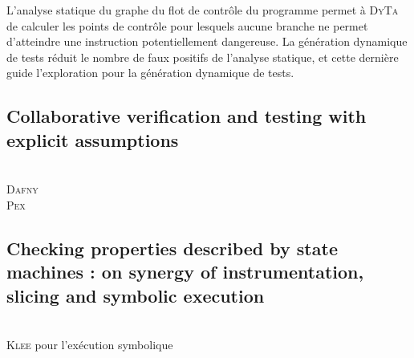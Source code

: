 L'analyse statique du graphe du flot de contrôle du programme permet à
\textsc{DyTa} de calculer les points de contrôle pour lesquels aucune branche ne
permet d'atteindre une instruction potentiellement dangereuse. La génération
dynamique de tests réduit le nombre de faux positifs de l'analyse statique, et
cette dernière guide l'exploration pour la génération dynamique de tests.

\subsection{Collaborative verification and testing with explicit assumptions}
\cite{collaborative-verification}\\
\textsc{Dafny} \cite{Dafny}\\
\textsc{Pex} \cite{Pex}

\subsection{Checking properties described by state machines : on synergy of
  instrumentation, slicing and symbolic execution}
\cite{checking-prop-state-machines}\\
\textsc{Klee} \cite{KLEE} pour l'exécution symbolique
